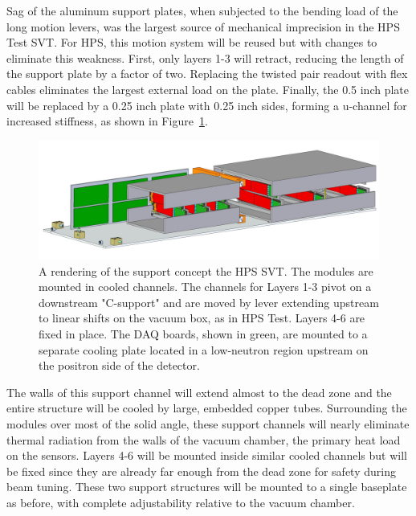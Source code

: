 Sag of the aluminum support plates, when subjected to the bending load of the long motion levers, was the largest source of mechanical imprecision in the HPS Test SVT.  For HPS, this motion system will be reused but with changes to eliminate this weakness. First, only layers 1-3 will retract, reducing the length of the support plate by a factor of two.  Replacing the twisted pair readout with flex cables eliminates the largest external load on the plate.  Finally, the 0.5 inch plate will be replaced by a 0.25 inch plate with 0.25 inch sides, forming a u-channel for increased stiffness, as shown in Figure~\ref{fig:newsupport}. 
\begin{figure}[ht]
    \includegraphics[width=\textwidth]{svt/figures/10dec8}
\caption{\small{A rendering of the support concept the HPS SVT.  The modules are mounted in cooled channels.  The channels for Layers 1-3 pivot on a downstream "C-support" and are moved by lever extending upstream to linear shifts on the vacuum box, as in HPS Test.  Layers 4-6 are fixed in place. The DAQ boards, shown in green, are mounted to a separate cooling plate located in a low-neutron region upstream on the positron side of the detector.} }
\label{fig:newsupport}
\end{figure}
The walls of this support channel will extend almost to the dead zone and the entire structure will be cooled by large, embedded copper tubes. Surrounding the modules over most of the solid angle, these support channels will nearly eliminate thermal radiation from the walls of the vacuum chamber, the primary heat load on the sensors.  Layers 4-6 will be mounted inside similar cooled channels but will be fixed since they are already far enough from the dead zone for safety during beam tuning. These two support structures will be mounted to a single baseplate as before, with complete adjustability relative to the vacuum chamber.  

